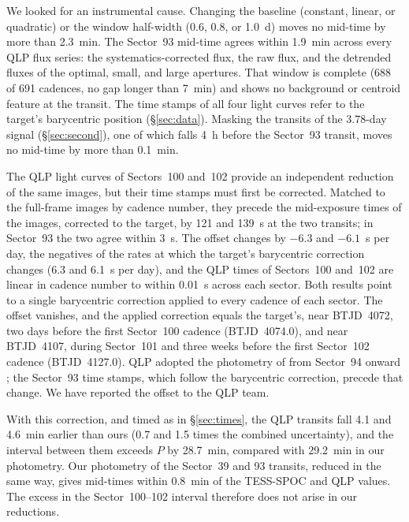 \documentclass[twocolumn,linenumbers]{aastex701}
\begin{document}
We looked for an instrumental cause. Changing the baseline (constant, linear, or quadratic) or the window half-width (0.6, 0.8, or 1.0~d) moves no mid-time by more than 2.3~min. The Sector~93 mid-time agrees within 1.9~min across every QLP flux series: the systematics-corrected flux, the raw flux, and the detrended fluxes of the optimal, small, and large apertures. That window is complete (688 of 691 cadences, no gap longer than 7~min) and shows no background or centroid feature at the transit. The time stamps of all four light curves refer to the target's barycentric position (\S\ref{sec:data}). Masking the transits of the 3.78-day signal (\S\ref{sec:second}), one of which falls 4~h before the Sector~93 transit, moves no mid-time by more than 0.1~min.

The QLP light curves of Sectors~100 and~102 provide an independent reduction of the same images, but their time stamps must first be corrected. Matched to the full-frame images by cadence number, they precede the mid-exposure times of the images, corrected to the target, by 121 and 139~s at the two transits; in Sector~93 the two agree within 3~s. The offset changes by $-6.3$ and $-6.1$~s per day, the negatives of the rates at which the target's barycentric correction changes (6.3 and 6.1~s per day), and the QLP times of Sectors~100 and~102 are linear in cadence number to within 0.01~s across each sector. Both results point to a single barycentric correction applied to every cadence of each sector. The offset vanishes, and the applied correction equals the target's, near BTJD~4072, two days before the first Sector~100 cadence (BTJD~4074.0), and near BTJD~4107, during Sector~101 and three weeks before the first Sector~102 cadence (BTJD~4127.0). QLP adopted the photometry of \citet{Han2023} from Sector~94 onward \citep{Petitpas2026}; the Sector~93 time stamps, which follow the barycentric correction, precede that change. We have reported the offset to the QLP team.

With this correction, and timed as in \S\ref{sec:times}, the QLP transits fall 4.1 and 4.6~min earlier than ours (0.7 and 1.5 times the combined uncertainty), and the interval between them exceeds $P$ by 28.7~min, compared with 29.2~min in our photometry. Our photometry of the Sector~39 and 93 transits, reduced in the same way, gives mid-times within 0.8~min of the TESS-SPOC and QLP values. The excess in the Sector~100--102 interval therefore does not arise in our reductions.
\end{document}
